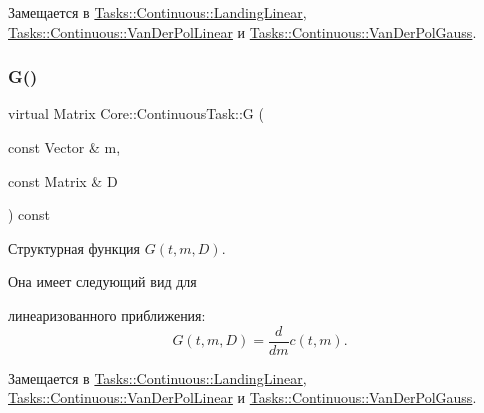 Замещается в \hyperlink{class_tasks_1_1_continuous_1_1_landing_linear_a8b06d0f38d73a27f7de0df6ba36b9c38}{Tasks\+::\+Continuous\+::\+Landing\+Linear}, \hyperlink{class_tasks_1_1_continuous_1_1_van_der_pol_linear_a2eefb5fca01c3517c44d2683032fda9d}{Tasks\+::\+Continuous\+::\+Van\+Der\+Pol\+Linear} и \hyperlink{class_tasks_1_1_continuous_1_1_van_der_pol_gauss_a2ef625f7f8c590726c5b52e67622c172}{Tasks\+::\+Continuous\+::\+Van\+Der\+Pol\+Gauss}.

\hypertarget{class_core_1_1_continuous_task_a1b579e183ffa229f97048aadfd834517}{}\label{class_core_1_1_continuous_task_a1b579e183ffa229f97048aadfd834517} 
\subsubsection{\texorpdfstring{G()}{G()}}
{\footnotesize\ttfamily virtual Matrix Core\+::\+Continuous\+Task\+::G (\begin{DoxyParamCaption}\item[{const Vector \&}]{m,  }\item[{const Matrix \&}]{D }\end{DoxyParamCaption}) const\hspace{0.3cm}{\ttfamily [pure virtual]}}



Структурная функция $G(t, m, D)$. 

Она имеет следующий вид для


\begin{DoxyItemize}
\item линеаризованного приближения\+: \[G(t, m, D) = \frac{d}{dm} c(t, m).\] 
\end{DoxyItemize}

Замещается в \hyperlink{class_tasks_1_1_continuous_1_1_landing_linear_af5937be9d9010e853956e5dd7ff96e8d}{Tasks\+::\+Continuous\+::\+Landing\+Linear}, \hyperlink{class_tasks_1_1_continuous_1_1_van_der_pol_linear_a931ba012a9671d8f522975232b48320f}{Tasks\+::\+Continuous\+::\+Van\+Der\+Pol\+Linear} и \hyperlink{class_tasks_1_1_continuous_1_1_van_der_pol_gauss_a1b61ca6de96df17b049bc7934a241e47}{Tasks\+::\+Continuous\+::\+Van\+Der\+Pol\+Gauss}.

\hypertarget{class_core_1_1_continuous_task_aa6bc3b3c0c973169878c4e4b481dc922}{}\label{class_core_1_1_continuous_task_aa6bc3b3c0c973169878c4e4b481dc922} 
